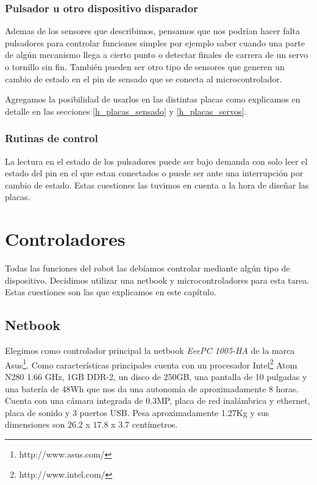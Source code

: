 \subsubsection{Pulsador u otro dispositivo disparador}
\label{h_sensado_pulsador}

Ademas de los sensores que describimos, pensamos que nos podr\'ian hacer falta pulsadores para controlar funciones
simples por ejemplo saber cuando una parte de alg\'un mecanismo llega a cierto punto o detectar finales de carrera
de un servo o tornillo sin fin.
Tambi\'en pueden ser otro tipo de sensores que generen un cambio de estado en el pin de sensado que se conecta al
microcontrolador.

Agregamos la posibilidad de usarlos en las distintas placas como explicamos en detalle en las secciones
\ref{h_placas_sensado} y \ref{h_placas_servos}.

\subsubsection{Rutinas de control}
\label{h_sensado_pulsador_rutinas}

La lectura en el estado de los pulsadores puede ser bajo demanda con solo leer el estado del pin en el que estan
conectados o puede ser ante una interrupci\'on por cambio de estado.
Estas cuestiones las tuvimos en cuenta a la hora de dise\~nar las placas.

\section{Controladores}
\label{h_controlador}

Todas las funciones del robot las deb\'iamos controlar mediante alg\'un tipo de dispositivo.
Decidimos utilizar una netbook y microcontroladores para esta tarea.
Estas cuestiones son las que explicamos en este cap\'itulo.

\subsection{Netbook}
\label{h_controlador_netbook}

Elegimos como controlador principal la netbook \emph{EeePC 1005-HA} de la marca Asus\footnote{http://www.asus.com/}.
Como caracter\'isticas principales cuenta con un procesador Intel\footnote{http://www.intel.com/} Atom N280 1.66 GHz,
1GB DDR-2, un disco de 250GB, una pantalla de 10 pulgadas y una bater\'ia de 48Wh que nos da una autonom\'ia de 
aproximadamente 8 horas.
Cuenta con una c\'amara integrada de 0.3MP, placa de red inal\'ambrica y ethernet, placa de sonido y 3 puertos USB.
Pesa aproximadamente 1.27Kg y sus dimensiones son $26.2$ x $17.8$ x $3.7$ cent\'imetros.

